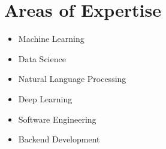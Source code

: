 \section{Areas of Expertise}
\begin{flushleft}
    \begin{minipage}[t]{0.33\textwidth}
            \begin{itemize}
                \item Machine Learning
                \item Data Science
            \end{itemize}
    \end{minipage}%
    \begin{minipage}[t]{0.4\textwidth}
            \begin{itemize}
                \item Natural Language Processing
                \item Deep Learning
            \end{itemize}
    \end{minipage}%
    \begin{minipage}[t]{0.24\textwidth}
            \begin{itemize}
                \item Software Engineering
                \item Backend Development
            \end{itemize}
    \end{minipage}
\end{flushleft}